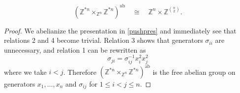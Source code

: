 \documentclass{amsbook} %
\numberwithin{section}{chapter}
\begin{document}
\begin{cor} \label{abst}
\[ (\mathbb{Z}^{\ast n} \times_{\mathbb{Z}^n} \mathbb{Z}^{\ast n})^{\mathrm{ab}} \quad \cong \quad \mathbb{Z}^n \times {\mathbb{Z}}^{{n}\choose{2}}. \]
\end{cor}
\begin{proof}
We abelianize the presentation in \cref{pushpres} and immediately see that relations 2 and 4 become trivial. Relation 3 shows that generators $\sigma_{ii}$ are unnecessary, and relation 1 can be rewritten as
\[
\sigma_{ji} = \sigma_{ij}^{-1}x_i^2 x_j^2
\]
where we take $i < j$. Therefore $(\mathbb{Z}^{\ast n} \times_{\mathbb{Z}^n} \mathbb{Z}^{\ast n})^{\mathrm{ab}}$ is the free abelian group on generators $x_1, \ldots, x_n$ and $\sigma_{ij}$ for $1 \leq i < j \leq n$.

\end{proof}
\end{document}
